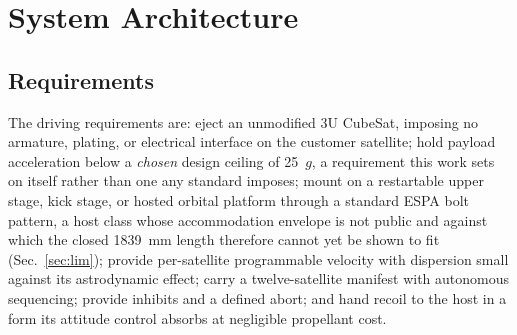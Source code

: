 \documentclass[conference]{IEEEtran}
\begin{document}
\section{System Architecture}
\subsection{Requirements}
The driving requirements are: eject an unmodified 3U CubeSat, imposing no armature, plating, or electrical interface on the customer satellite; hold payload acceleration below a \emph{chosen} design ceiling of 25~$g$, a requirement this work sets on itself rather than one any standard imposes; mount on a restartable upper stage, kick stage, or hosted orbital platform through a standard ESPA bolt pattern, a host class whose accommodation envelope is not public and against which the closed 1839~mm length therefore cannot yet be shown to fit (Sec.~\ref{sec:lim}); provide per-satellite programmable velocity with dispersion small against its astrodynamic effect; carry a twelve-satellite manifest with autonomous sequencing; provide inhibits and a defined abort; and hand recoil to the host in a form its attitude control absorbs at negligible propellant cost.
\end{document}
